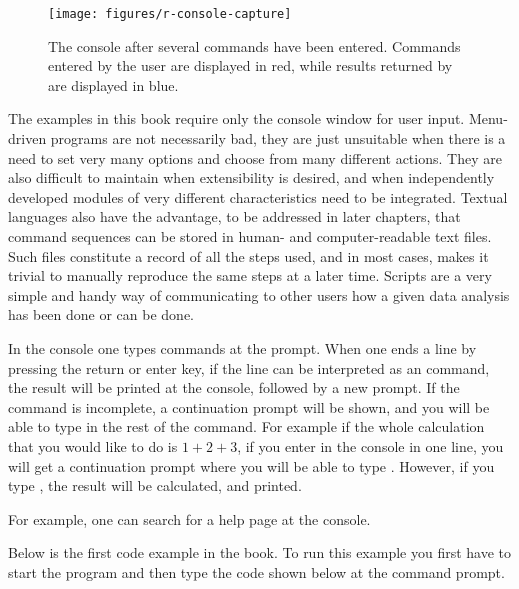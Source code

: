 \documentclass[krantz2]{krantz}\usepackage{knitr}
\begin{document}
\begin{figure}
  \centering
  \texttt{[image: figures/r-console-capture]}
  \caption[The R console]{The \Rpgrm console after several commands have been entered. Commands entered by the user are displayed in red, while results returned by \Rpgrm are displayed in blue.}\label{fig:intro:console:capture}
\end{figure}

The examples in this book require only the console window for user input. Menu-driven programs are not necessarily bad, they are just unsuitable when there is a need to set very many options and choose from many different actions. They are also difficult to maintain when extensibility is desired, and when independently developed modules of very different characteristics need to be integrated. Textual languages also have the advantage, to be addressed in later chapters, that command sequences can be stored in human- and computer-readable text files. Such files constitute a record of all the steps used, and in most cases, makes it trivial to manually reproduce the same steps at a later time. Scripts are a very simple and handy way of communicating to other users how a given data analysis has been done or can be done.

\begin{explainbox}
In the console one types commands at the \code{>} prompt. When one ends a line by pressing the return or enter key, if the line can be interpreted as an \Rlang command, the result will be printed at the console, followed by a new \code{>} prompt.
If the command is incomplete, a \code{+} continuation prompt will be shown, and you will be able to type in the rest of the command. For example if the whole calculation that you would like to do is $1 + 2 + 3$, if you enter in the console  in one line, you will get a continuation prompt where you will be able to type . However, if you type , the result will be calculated, and printed.
\end{explainbox}

For example, one can search for a help page at the \Rpgrm console.

\begin{infobox}
Below is the first code example in the book. To run this example you first have to start the \Rpgrm program and then type the code shown below at the command prompt.
\end{infobox}

\begin{knitrout}\footnotesize
{}\color{fgcolor}\begin{kframe}
\begin{alltt}
\hlstd{(}\hlstd{)}
\end{alltt}
\end{kframe}
\end{knitrout}
\end{document}
